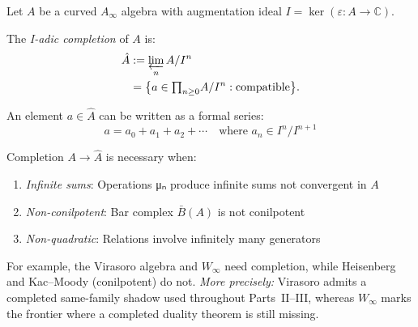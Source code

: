 \begin{definition}
\label{def:i-adic-topology}
Let $A$ be a curved $A_\infty$ algebra with augmentation ideal $I = \ker(\varepsilon: A \to \mathbb{C})$.

The \emph{I-adic completion} of $A$ is:
\begin{align}
\hat{A} &:= \varprojlim_n A/I^n \notag \\
  &= \bigl\{a \in {\textstyle\prod_{n \geq 0}} A/I^n :
  \text{compatible}\bigr\}.
\end{align}

An element $a \in \hat{A}$ can be written as a formal series:
\begin{equation}
a = a_0 + a_1 + a_2 + \cdots \quad \text{where } a_n \in I^n/I^{n+1}
\end{equation}
\end{definition}

\begin{theorem}
\label{thm:completion-necessity}
Completion $A \to \hat{A}$ is necessary when:
\begin{enumerate}
\item \emph{Infinite sums}: Operations μₙ produce infinite sums not convergent in $A$
\item \emph{Non-conilpotent}: Bar complex $\bar{B}(A)$ is not conilpotent
\item \emph{Non-quadratic}: Relations involve infinitely many generators
\end{enumerate}

For example, the Virasoro algebra and $W_\infty$ need completion, while Heisenberg and Kac--Moody (conilpotent) do not.
\emph{More precisely:} Virasoro admits a completed same-family shadow used
throughout Parts~II--III, whereas $W_\infty$ marks the frontier where a
completed duality theorem is still missing.
\end{theorem}

